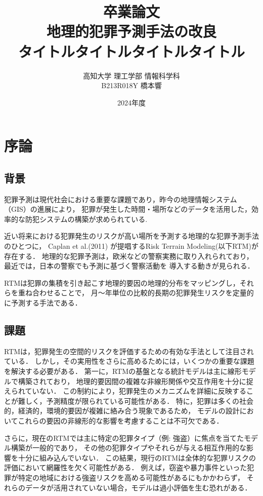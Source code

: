 \documentclass[12pt,a4paper,oneside]{jsbook}
\title{
卒業論文\\[1.5cm]
地理的犯罪予測手法の改良\\
タイトルタイトルタイトルタイトル\\[5cm]
}
\author{高知大学 理工学部 情報科学科\\[0.5cm]
B213R018Y 橋本響}
\date{2024年度}
\theoremstyle{plain}
\begin{document}
\maketitle
\tableofcontents

\chapter{序論}
\label{chapter_1}
\section{背景}
犯罪予測は現代社会における重要な課題であり，昨今の地理情報システム（GIS）の進展により，
犯罪が発生した時間・場所などのデータを活用した，効率的な防犯システムの構築が求められている.

近い将来における犯罪発生のリスクが高い場所を予測する地理的な犯罪予測手法のひとつに，
Caplan et al.(2011)
\cite{caplan2011}
が提唱するRisk Terrain Modeling(以下RTM)が存在する．
地理的な犯罪予測は，欧米などの警察実務に取り入れられており，最近では，日本の警察でも予測に基づく警察活動を
導入する動きが見られる．

RTMは犯罪の集積を引き起こす地理的要因の地理的分布をマッピングし，それらを重ね合わせることで，
月〜年単位の比較的長期の犯罪発生リスクを定量的に予測する手法である．

\section{課題}
RTMは，犯罪発生の空間的リスクを評価するための有効な手法として注目されている．
しかし，その実用性をさらに高めるためには，いくつかの重要な課題を解決する必要がある．
第一に，RTMの基盤となる統計モデルは主に線形モデルで構築されており，
地理的要因間の複雑な非線形関係や交互作用を十分に捉えられていない．
この制約により，犯罪発生のメカニズムを詳細に反映することが難しく，予測精度が限られている可能性がある．
特に，犯罪は多くの社会的，経済的，環境的要因が複雑に絡み合う現象であるため，
モデルの設計においてこれらの要因の非線形的な影響を考慮することは不可欠である．

さらに，現在のRTMでは主に特定の犯罪タイプ（例: 強盗）に焦点を当てたモデル構築が一般的であり，
その他の犯罪タイプやそれらが与える相互作用的な影響を十分に組み込んでいない．
この結果，現行のRTMは全体的な犯罪リスクの評価において網羅性を欠く可能性がある．
例えば，窃盗や暴力事件といった犯罪が特定の地域における強盗リスクを高める可能性があるにもかかわらず，
それらのデータが活用されていない場合，モデルは過小評価を生む恐れがある．
\end{document}

